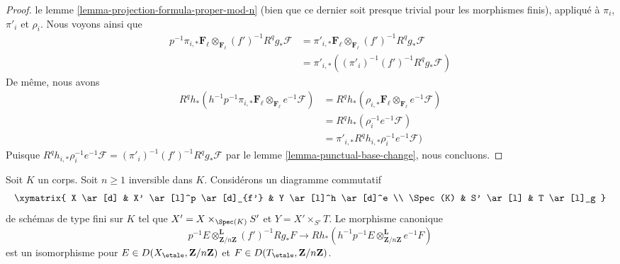 \begin{proof}
le lemme \ref{lemma-projection-formula-proper-mod-n}
(bien que ce dernier soit presque trivial pour les morphismes finis), appliqué à
$\pi_i$, $\pi'_i$ et $\rho_i$.
Nous voyons ainsi que
\begin{align*}
p^{-1}\pi_{i, *}\mathbf{F}_\ell
\otimes_{\mathbf{F}_\ell} (f')^{-1}R^qg_*\mathcal{F}
& =
\pi'_{i, *}\mathbf{F}_\ell
\otimes_{\mathbf{F}_\ell} (f')^{-1}R^qg_*\mathcal{F} \\
& =
\pi'_{i, *}((\pi'_i)^{-1} (f')^{-1}R^qg_*\mathcal{F})
\end{align*}
De même, nous avons
\begin{align*}
R^qh_*(h^{-1}p^{-1} \pi_{i, *}\mathbf{F}_\ell
\otimes_{\mathbf{F}_\ell} e^{-1}\mathcal{F})
& =
R^qh_*(\rho_{i, *}\mathbf{F}_\ell
\otimes_{\mathbf{F}_\ell} e^{-1}\mathcal{F}) \\
& =
R^qh_*(\rho_i^{-1}e^{-1}\mathcal{F}) \\
& =
\pi'_{i, *}R^qh_{i, *} \rho_i^{-1}e^{-1}\mathcal{F})
\end{align*}
Puisque
$R^qh_{i, *} \rho_i^{-1}e^{-1}\mathcal{F} = 
(\pi'_i)^{-1} (f')^{-1}R^qg_*\mathcal{F}$ par le
lemme \ref{lemma-punctual-base-change},
nous concluons.
\end{proof}

\begin{lemma}
\label{lemma-punctual-base-change-upgrade-unbounded}
Soit $K$ un corps. Soit $n \geq 1$ inversible dans $K$.
Considérons un diagramme commutatif
$$
\xymatrix{
X \ar[d] & X' \ar[l]^p \ar[d]_{f'} & Y \ar[l]^h \ar[d]^e \\
\Spec(K) & S' \ar[l] & T \ar[l]_g
}
$$
de schémas de type fini sur $K$ tel que
$X' = X \times_{\Spec(K)} S'$ et $Y = X' \times_{S'} T$.
Le morphisme canonique
$$
p^{-1}E \otimes_{\mathbf{Z}/n\mathbf{Z}}^\mathbf{L} (f')^{-1}Rg_*F
\longrightarrow
Rh_*(h^{-1}p^{-1}E \otimes_{\mathbf{Z}/n\mathbf{Z}}^\mathbf{L} e^{-1}F)
$$
est un isomorphisme pour $E \in D(X_\etale, \mathbf{Z}/n\mathbf{Z})$
et $F \in D(T_\etale, \mathbf{Z}/n\mathbf{Z})$.
\end{lemma}

